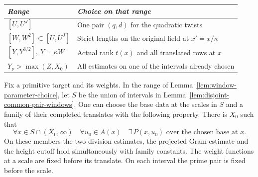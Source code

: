 \begin{construction}
\begin{tabular}{@{}ll@{}}
\toprule
\textit{Range} & \textit{Choice on that range}\\
\midrule
\([U,U^J]\) & One pair \((q,d)\) for the quadratic twists\\
\([W,W^2]\subset[U,U^J]\) & Strict lengths on the original field at \(x'=x/\kappa\)\\
\([Y,Y^{3/2}],\ Y=\kappa W\) & Actual rank \(t(x)\) and all translated rows at \(x\)\\
\(Y_\nu>\max(Z,X_0)\) & All estimates on one of the intervals already chosen\\
\bottomrule
\end{tabular}
\caption{Selection of an interval in Lemma~\ref{lem:disjoint-common-pair-windows}. The first three choices give a sequence of disjoint intervals. The last line is used after bounding the two division errors and the Gram error on the resulting family.}\label{fig:common-window-choice}
\end{construction}

\begin{proposition}\label{prop:all-window-applications}
Fix a primitive target and its weights. In the range of
Lemma~\ref{lem:window-parameter-choice}, let \(S\) be the union of
intervals in Lemma~\ref{lem:disjoint-common-pair-windows}. One can
choose the base data at the scales in \(S\) and a family of their
completed translates with the following property. There is \(X_0\)
such that
\[
 \forall x\in S\cap(X_0,\infty)\quad
 \forall u_0\in A(x)\quad
 \exists\,P(x,u_0)\text{ over the chosen base at }x .
\]
On these members the two division estimates, the projected Gram
estimate and the height cutoff hold simultaneously with family
constants. The weight functions at a scale are fixed before its
translate. On each interval the prime pair is fixed before the scale.
\end{proposition}

